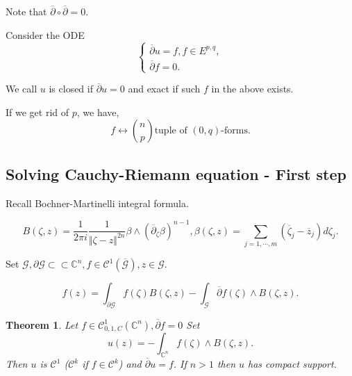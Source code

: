 \documentclass{article}
\newtheorem{theorem}{Theorem} [section]
\newcommand{\norm}[1]{\Vert #1 \Vert}
\newcommand{\C}[0]{\mathbb{C}}
\newcommand{\G}[0]{\mathcal{G}}
\newcommand{\bd}[0]{\partial}
\newcommand{\compembed}[0]{\subset\subset}
\begin{document}
Note that $\overline{\partial}\circ\overline{\partial} = 0$.
\par Consider the ODE 
\begin{equation*}
  \begin{cases}
    \overline{\partial}u = f, f\in E^{p,q},\\
    \overline{\partial}f = 0.
  \end{cases}
\end{equation*}

We call $u$ is closed if $\overline{\partial}u = 0$ and exact if such $f$ in the above exists.
\par If we get rid of $p$, we have,
\begin{equation*}
  f\leftrightarrow {n\choose p}\text{tuple of $(0,q)$-forms}.
\end{equation*}

\subsection{Solving Cauchy-Riemann equation - First step}
Recall Bochner-Martinelli integral formula.

\begin{equation*}
  B(\zeta,z) = {\frac 1 {2\pi i}}{\frac 1 {\norm{\zeta-z}^{2n}}}\beta\wedge(\overline{\partial}_\zeta\beta)^{n-1}, \beta(\zeta,z) = \sum_{j=1,\cdots,m}(\overline{\zeta}_j-\overline{z}_j)d\zeta_j.
\end{equation*}


Set $\G,\bd\G\compembed\C^n,f\in\mathcal{C}^1(\overline{\G}),z\in\G$.

\begin{equation*}
  f(z) = \int_{\bd\G}f(\zeta)B(\zeta,z)-\int_\G\overline{\partial}f(\zeta)\wedge B(\zeta,z).
\end{equation*}

\begin{theorem}
  \label{theorem_1_1_cr}
  Let $f\in\mathcal{C}^1_{0,1,C}(\C^n), \overline{\partial}f=0$ Set 
  \begin{equation*}
    u(z) = - \int_{\C^n}f(\zeta)\wedge B(\zeta,z).
  \end{equation*}
  Then $u$ is $\mathcal{C}^1$ ($\mathcal{C}^k$ if $f\in\mathcal{C}^k$) and $\overline{\partial}u = f$. If $n>1$ then $u$ has compact support.
\end{theorem}
\end{document}
